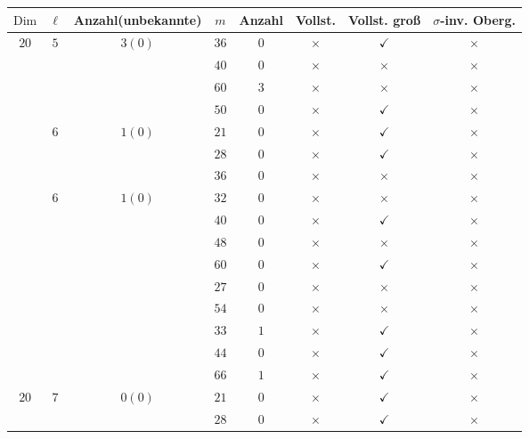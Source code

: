 \documentclass[12pt,a4paper,halfparskip,headsepline,bibtotocnumbered]{scrreprt}
\theoremstyle{nummermitklammern}
\theoremstyle{nonumberbreak}
\newcommand{\Dim}{\text{Dim}}
\begin{document}
\begin{table}[H]
	\centering
	\begin{tabular}{|c|c|c|c|c|c|c|c|}
		\hline		
		$\Dim$					&$\ell$					&{Anzahl(unbekannte)}		&$m$	&Anzahl	&Vollst.	&Vollst. groß	&$\sigma$-inv. Oberg.\\ \hline
		\multirow{10}{*}{$20$}	&\multirow{3}{*}{$5$}	&\multirow{3}{*}{$3(0)$}	&$36$	&$0$	&$\times$		&$\checkmark$	&$\times$\\ \cline{4-8}
								&						&							&$40$	&$0$	&$\times$		&$\times$		&$\times$\\ \cline{4-8}
								&						&							&$60$	&$3$	&$\times$		&$\times$		&$\times$\\ \cline{2-8}	
								&						&							&$50$	&$0$	&$\times$		&$\checkmark$	&$\times$\\ \cline{4-8}
								&\multirow{3}{*}{$6$}	&\multirow{3}{*}{$1(0)$}	&$21$	&$0$	&$\times$		&$\checkmark$	&$\times$\\ \cline{4-8}
								&						&							&$28$	&$0$	&$\times$		&$\checkmark$	&$\times$\\ \cline{4-8}
								&						&							&$36$	&$0$	&$\times$		&$\times$		&$\times$\\ \cline{2-8}
								&\multirow{9}{*}{$6$}	&\multirow{9}{*}{$1(0)$}	&$32$	&$0$	&$\times$		&$\times$		&$\times$\\ \cline{4-8}
								&						&							&$40$	&$0$	&$\times$		&$\checkmark$	&$\times$\\ \cline{4-8}
								&						&							&$48$	&$0$	&$\times$		&$\times$		&$\times$\\ \cline{4-8}
								&						&							&$60$	&$0$	&$\times$		&$\checkmark$	&$\times$\\ \cline{4-8}
								&						&							&$27$	&$0$	&$\times$		&$\times$		&$\times$\\ \cline{4-8}
								&						&							&$54$	&$0$	&$\times$		&$\times$		&$\times$\\ \cline{4-8}
								&						&							&$33$	&$1$	&$\times$		&$\checkmark$	&$\times$\\ \cline{4-8}
								&						&							&$44$	&$0$	&$\times$		&$\checkmark$	&$\times$\\ \cline{4-8}
								&						&							&$66$	&$1$	&$\times$		&$\checkmark$	&$\times$\\ \hline
		\multirow{18}{*}{$20$}	&\multirow{4}{*}{$7$}	&\multirow{4}{*}{$0(0)$}	&$21$	&$0$	&$\times$		&$\checkmark$	&$\times$\\ \cline{4-8}
								&						&							&$28$	&$0$	&$\times$		&$\checkmark$	&$\times$\\ \cline{4-8}

\end{tabular}
\end{table}
\end{document}

